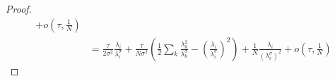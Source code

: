 \documentclass[11pt]{article}
\newcommand{\EE}{\mathbb{E}}
\newcommand{\diag}[1]{\operatorname{Diag}\left({#1}\right)}
\begin{document}
\begin{proof}
\begin{align*}
    +  o \left(\tau, \frac{1}{N}\right) \\
    &= \frac{\tau}{2\sigma^2} \frac{\lambda_i}{\lambda^\sigma_i}
    +  \frac{\tau}{N \sigma^2} \left( \frac{1}{2} \sum_k \frac{\lambda_k^2}{\lambda^\sigma_k}- \left(\frac{\lambda_i}{\lambda^\sigma_i}\right)^2 \right) 
    + \frac{1}{N} \frac{\lambda_i}{(\lambda^\sigma_i)^2}
    +  o \left(\tau, \frac{1}{N}\right) 
\end{align*}



\end{proof}
\end{document}
